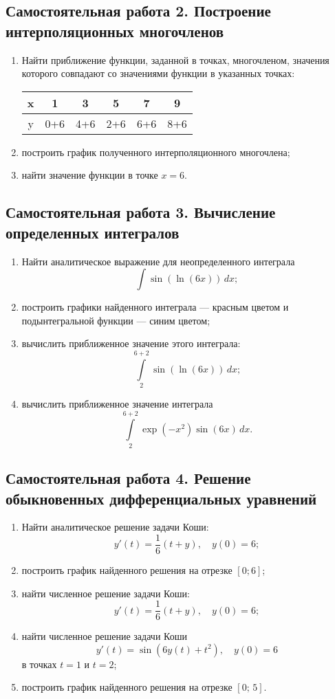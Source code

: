 \documentclass[10pt, a4paper, titlepage]{article}
\begin{document}
\subsection*{Самостоятельная работа \textnumero{} 2. Построение интерполяционных многочленов}
\begin{enumerate}
    \item Найти приближение функции, заданной в точках, многочленом, значения которого совпадают со значениями функции в указанных точках:
    \begin{center}
         \begin{tabular}{|*{6}{C|}}
             \hline
             x & 1 & 3 & 5 & 7 & 9 \\ \hline
             y & 0+6 & 4+6 & 2+6 & 6+6 & 8+6 \\
             \hline
         \end{tabular}
    \end{center}
    \item построить график полученного интерполяционного многочлена;
    \item найти значение функции в точке $x=6$.
\end{enumerate}

\subsection*{Самостоятельная работа \textnumero{} 3. Вычисление определенных интегралов}
\begin{enumerate}
    \item Найти аналитическое выражение для неопределенного интеграла $$\int \sin(\ln(6x))\,dx ;$$
    \item построить графики найденного интеграла --- красным цветом и подынтегральной функции --- синим цветом;
    \item вычислить приближенное значение этого интеграла: $$\int\limits_2^{6+2} \sin(\ln(6x))\,dx ;$$
    \item вычислить приближенное значение интеграла $$\int\limits_2^{6+2} \exp(-x^2)\sin(6x)\,dx .$$
\end{enumerate}

\subsection*{Самостоятельная работа \textnumero{} 4. Решение обыкновенных дифференциальных уравнений}
\begin{enumerate}
    \item Найти аналитическое решение задачи Коши: $$y'(t)=\frac{1}{6}(t+y), \quad y(0)=6 ;$$
    \item построить график найденного решения на отрезке $[0; 6]$;
    \item найти численное решение задачи Коши: $$y'(t)=\frac{1}{6}(t+y), \quad y(0)=6 ;$$
    \item найти численное решение задачи Коши $$y'(t)=\sin(6y(t)+t^2), \quad y(0)=6$$ в точках $t=1$ и $t=2$;
    \item построить график найденного решения на отрезке $[0;\,5]$.
\end{enumerate}
\end{document}
